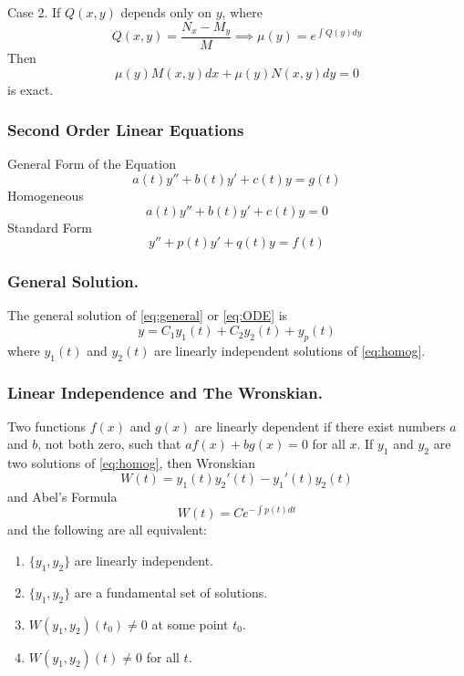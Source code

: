 \documentclass[../../main.tex]{subfiles}
\begin{document}
Case 2. If $Q(x,y)$ depends only on $y$, where
\begin{equation*}
Q(x,y)=\dfrac{N_x-M_y}{M} \implies \mu(y) = e^{\int Q(y)dy}
\end{equation*}
Then 
\begin{equation*}
\mu(y) M(x,y) dx + \mu(y)N(x,y) dy =0
\end{equation*}
is exact.

\subsubsection*{Second Order Linear Equations} General Form of the Equation
\begin{equation} 
a(t)y''+b(t)y'+c(t)y=g(t) \label{eq:general}
\end{equation}
Homogeneous
\begin{equation}
a(t)y''+b(t)y'+c(t)y=0\label{eq:homog}
\end{equation}
Standard Form
\begin{equation}
 y''+p(t)y'+q(t)y=f(t) \label{eq:ODE}
\end{equation}

\subsubsection*{General Solution.} The general solution of \eqref{eq:general} or \eqref{eq:ODE} is 
\begin{equation}
y = C_1 y_1(t) + C_2 y_2 (t) + y_p(t)
\end{equation}
where $y_1(t)$ and $y_2(t)$ are linearly independent solutions of \eqref{eq:homog}.

\subsubsection*{Linear Independence and The Wronskian.} Two functions $f(x)$ and $g(x)$ are linearly dependent if there exist numbers $a$ and $b$, not both zero, such that $af(x)+bg(x)=0$ for all $x$. If $y_1$ and $y_2$ are two solutions of \eqref{eq:homog}, then Wronskian
\begin{equation*}
W(t) = y_1(t) y_2'(t) - y_1'(t) y_2(t)
\end{equation*}
and Abel's Formula
\begin{equation*}
W(t) = Ce^{-\int{p(t)dt}}
\end{equation*}
and the following are all equivalent: 
\begin{enumerate}
\item $\{y_1,y_2\}$ are linearly independent.
\item $\{y_1,y_2\}$ are a fundamental set of solutions.
\item $W(y_1, y_2)(t_0)\neq 0$ at some point $t_0$.
\item $W(y_1,y_2)(t) \neq 0$ for all $t$.
\end{enumerate}
\end{document}
